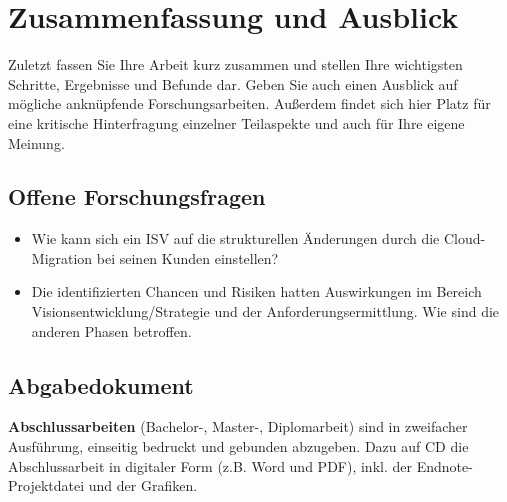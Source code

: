 \section{Zusammenfassung und Ausblick}
\label{cha:fazit}
Zuletzt fassen Sie Ihre Arbeit kurz zusammen und stellen Ihre wichtigsten Schritte, Ergebnisse und Befunde dar. Geben Sie auch einen Ausblick auf mögliche anknüpfende Forschungsarbeiten. Außerdem findet sich hier Platz für eine kritische Hinterfragung einzelner Teilaspekte und auch für Ihre eigene Meinung.

\subsection{Offene Forschungsfragen}
\begin{itemize}
	\item Wie kann sich ein ISV auf die strukturellen Änderungen durch die 
Cloud-Migration bei seinen Kunden einstellen?
	\item Die identifizierten Chancen und Risiken hatten Auswirkungen im 
Bereich Visionsentwicklung/Strategie und der Anforderungsermittlung. Wie sind 
die anderen Phasen betroffen.
\end{itemize}




\subsection{Abgabedokument}
\textbf{Abschlussarbeiten} (Bachelor-, Master-, Diplomarbeit) sind in zweifacher 
Ausführung, einseitig bedruckt und gebunden abzugeben. Dazu auf CD die 
Abschlussarbeit in digitaler Form (z.B. Word und PDF), inkl. der 
Endnote-Projektdatei und der Grafiken. 
